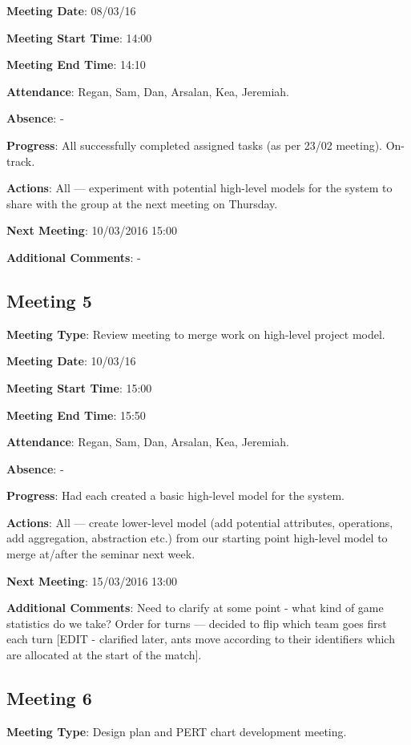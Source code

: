 \documentclass[11pt]{article}
\begin{document}
\textbf{Meeting Date}: 08/03/16

\textbf{Meeting Start Time}: 14:00

\textbf{Meeting End Time}: 14:10

\textbf{Attendance}: Regan, Sam, Dan, Arsalan, Kea, Jeremiah.

\textbf{Absence}: -

\textbf{Progress}: All successfully completed assigned tasks (as per 23/02 meeting). On-track.

\textbf{Actions}: All --- experiment with potential high-level models for the system to share with the group at the next meeting on Thursday.

\textbf{Next Meeting}: 10/03/2016 15:00

\textbf{Additional Comments}: -

\subsection{Meeting 5}

\textbf{Meeting Type}: Review meeting to merge work on high-level project model.

\textbf{Meeting Date}: 10/03/16

\textbf{Meeting Start Time}: 15:00

\textbf{Meeting End Time}: 15:50

\textbf{Attendance}: Regan, Sam, Dan, Arsalan, Kea, Jeremiah.

\textbf{Absence}: -

\textbf{Progress}: Had each created a basic high-level model for the system.

\textbf{Actions}: All --- create lower-level model (add potential attributes, operations, add aggregation, abstraction etc.) from our starting point high-level model to merge at/after the seminar next week.

\textbf{Next Meeting}: 15/03/2016 13:00

\textbf{Additional Comments}: Need to clarify at some point - what kind of game statistics do we take? Order for turns --- decided to flip which team goes first each turn [EDIT - clarified later, ants move according to their identifiers which are allocated at the start of the match].

\subsection{Meeting 6}

\textbf{Meeting Type}: Design plan and PERT chart development meeting.
\end{document}

